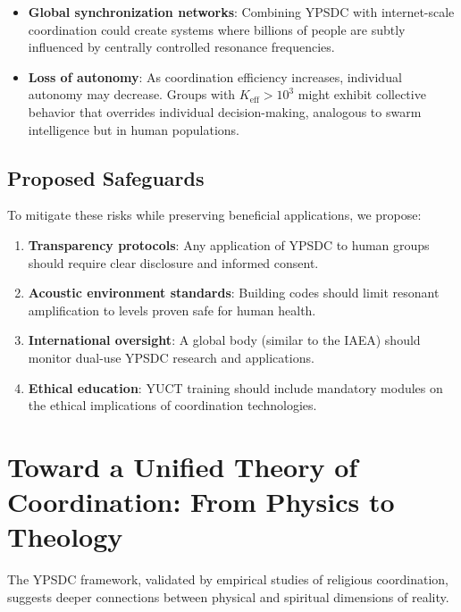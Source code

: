 \documentclass[12pt,a4paper]{article}
\begin{document}
	\begin{itemize}
		\item \textbf{Global synchronization networks}: Combining YPSDC with internet-scale coordination could create systems where billions of people are subtly influenced by centrally controlled resonance frequencies.
		
		\item \textbf{Loss of autonomy}: As coordination efficiency increases, individual autonomy may decrease. Groups with $K_{\mathrm{eff}} > 10^3$ might exhibit collective behavior that overrides individual decision-making, analogous to swarm intelligence but in human populations.
	\end{itemize}
	
	\subsection{Proposed Safeguards}
	
	To mitigate these risks while preserving beneficial applications, we propose:
	
	\begin{enumerate}
		\item \textbf{Transparency protocols}: Any application of YPSDC to human groups should require clear disclosure and informed consent.
		
		\item \textbf{Acoustic environment standards}: Building codes should limit resonant amplification to levels proven safe for human health.
		
		\item \textbf{International oversight}: A global body (similar to the IAEA) should monitor dual-use YPSDC research and applications.
		
		\item \textbf{Ethical education}: YUCT training should include mandatory modules on the ethical implications of coordination technologies.
	\end{enumerate}
	
	\section{Toward a Unified Theory of Coordination: From Physics to Theology}
	\label{sec:philosophy}
	
	The YPSDC framework, validated by empirical studies of religious coordination, suggests deeper connections between physical and spiritual dimensions of reality.
	
\end{document}
